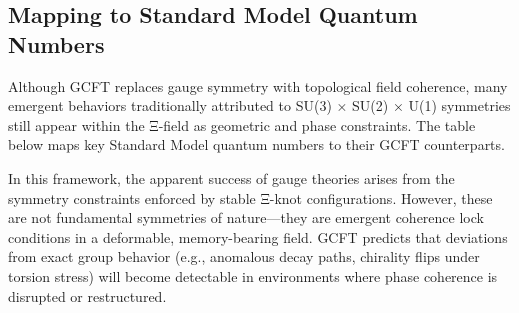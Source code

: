 \subsection{Mapping to Standard Model Quantum Numbers}
\label{sec:sm_mapping}

Although GCFT replaces gauge symmetry with topological field coherence, many emergent behaviors traditionally attributed to SU(3) × SU(2) × U(1) symmetries still appear within the Ξ-field as geometric and phase constraints. The table below maps key Standard Model quantum numbers to their GCFT counterparts.

\begin{table}[H]
\centering
{}
\caption{Mapping of Standard Model gauge quantities to GCFT field-theoretic topologies.}
\label{tab:sm_gcft_mapping}
\end{table}

In this framework, the apparent success of gauge theories arises from the symmetry constraints enforced by stable Ξ-knot configurations. However, these are not fundamental symmetries of nature—they are emergent coherence lock conditions in a deformable, memory-bearing field. GCFT predicts that deviations from exact group behavior (e.g., anomalous decay paths, chirality flips under torsion stress) will become detectable in environments where phase coherence is disrupted or restructured.

